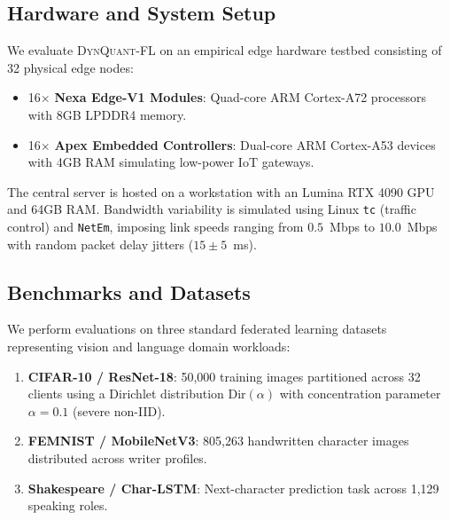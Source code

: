 \documentclass[conference]{IEEEtran}
\begin{document}
\subsection{Hardware and System Setup}
We evaluate \textsc{DynQuant-FL} on an empirical edge hardware testbed consisting of 32 physical edge nodes:
\begin{itemize}
    \item 16$\times$ \textbf{Nexa Edge-V1 Modules}: Quad-core ARM Cortex-A72 processors with 8GB LPDDR4 memory.
    \item 16$\times$ \textbf{Apex Embedded Controllers}: Dual-core ARM Cortex-A53 devices with 4GB RAM simulating low-power IoT gateways.
\end{itemize}

The central server is hosted on a workstation with an Lumina RTX 4090 GPU and 64GB RAM. Bandwidth variability is simulated using Linux \texttt{tc} (traffic control) and \texttt{NetEm}, imposing link speeds ranging from $0.5$~Mbps to $10.0$~Mbps with random packet delay jitters ($15 \pm 5$~ms).

\subsection{Benchmarks and Datasets}
We perform evaluations on three standard federated learning datasets representing vision and language domain workloads:
\begin{enumerate}
    \item \textbf{CIFAR-10 / ResNet-18}: 50,000 training images partitioned across 32 clients using a Dirichlet distribution $\text{Dir}(\alpha)$ with concentration parameter $\alpha = 0.1$ (severe non-IID).
    \item \textbf{FEMNIST / MobileNetV3}: 805,263 handwritten character images distributed across writer profiles.
    \item \textbf{Shakespeare / Char-LSTM}: Next-character prediction task across 1,129 speaking roles.
\end{enumerate}
\end{document}
